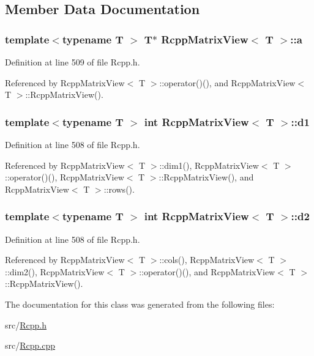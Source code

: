 \subsection{Member Data Documentation}
\hypertarget{classRcppMatrixView_ad38481118f63a84a132e8f2265de5bdd}{
\subsubsection[{a}]{\setlength{\rightskip}{0pt plus 5cm}template$<$typename T $>$ T$\ast$ {\bf RcppMatrixView}$<$ T $>$::{\bf a}}}
\label{classRcppMatrixView_ad38481118f63a84a132e8f2265de5bdd}


Definition at line 509 of file Rcpp.h.

Referenced by RcppMatrixView$<$ T $>$::operator()(), and RcppMatrixView$<$ T $>$::RcppMatrixView().\hypertarget{classRcppMatrixView_ad492401691ef709f6d2ef7dc1dcc2134}{
\subsubsection[{d1}]{\setlength{\rightskip}{0pt plus 5cm}template$<$typename T $>$ int {\bf RcppMatrixView}$<$ T $>$::{\bf d1}}}
\label{classRcppMatrixView_ad492401691ef709f6d2ef7dc1dcc2134}


Definition at line 508 of file Rcpp.h.

Referenced by RcppMatrixView$<$ T $>$::dim1(), RcppMatrixView$<$ T $>$::operator()(), RcppMatrixView$<$ T $>$::RcppMatrixView(), and RcppMatrixView$<$ T $>$::rows().\hypertarget{classRcppMatrixView_a37b5f5806957eeb0b688d6a157a2a264}{
\subsubsection[{d2}]{\setlength{\rightskip}{0pt plus 5cm}template$<$typename T $>$ int {\bf RcppMatrixView}$<$ T $>$::{\bf d2}}}
\label{classRcppMatrixView_a37b5f5806957eeb0b688d6a157a2a264}


Definition at line 508 of file Rcpp.h.

Referenced by RcppMatrixView$<$ T $>$::cols(), RcppMatrixView$<$ T $>$::dim2(), RcppMatrixView$<$ T $>$::operator()(), and RcppMatrixView$<$ T $>$::RcppMatrixView().

The documentation for this class was generated from the following files:\begin{DoxyCompactItemize}
\item 
src/\hyperlink{Rcpp_8h}{Rcpp.h}\item 
src/\hyperlink{Rcpp_8cpp}{Rcpp.cpp}\end{DoxyCompactItemize}
